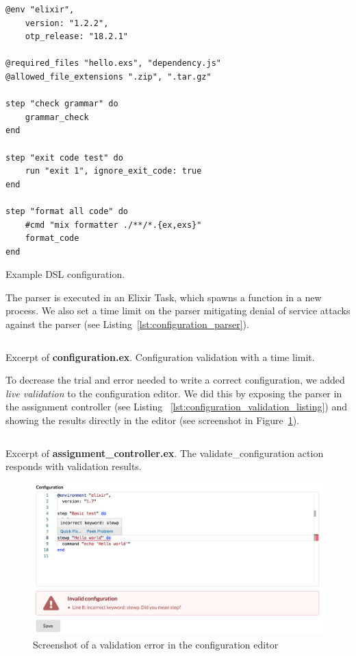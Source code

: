 \begin{listing}
\begin{verbatim}
@env "elixir",
	version: "1.2.2",
	otp_release: "18.2.1"

@required_files "hello.exs", "dependency.js"
@allowed_file_extensions ".zip", ".tar.gz"

step "check grammar" do
	grammar_check
end

step "exit code test" do
	run "exit 1", ignore_exit_code: true
end

step "format all code" do
	#cmd "mix formatter ./**/*.{ex,exs}"
	format_code
end
\end{verbatim}
\caption{Example DSL configuration.}
\label{lst:dsl_example}
\end{listing}


The parser is executed in an Elixir Task, which spawns a function in a new process. We also set a time limit on the parser mitigating denial of service attacks against the parser (see Listing~\ref{lst:configuration_parser}).

\begin{listing}
    \inputminted[firstline=14,lastline=24]{elixir}{code/server/lib/thesis/configuration.ex}
    \caption{Excerpt of \textbf{configuration.ex}. Configuration validation with a time limit.}
    \label{lst:configuration_parser}
\end{listing}

To decrease the trial and error needed to write a correct configuration, we added \emph{live validation} to the configuration editor. We did this by exposing the parser in the assignment controller (see Listing ~\ref{lst:configuration_validation_listing}) and showing the results directly in the editor (see screenshot in Figure~\ref{fig:editor_screenshot}).

\begin{listing}
    \inputminted[firstline=29,lastline=36]{elixir}{code/server/lib/thesis_web/controllers/assignment_controller.ex}
    \caption{Excerpt of \textbf{assignment\_controller.ex}. The validate\_configuration action responds with validation results.}
    \label{lst:configuration_validation_listing}
\end{listing}

\begin{figure}
    \centering
    \includegraphics[width=\textwidth]{figure/screenshot_editor.png}
    \caption{Screenshot of a validation error in the configuration editor}
    \label{fig:editor_screenshot}
\end{figure}

